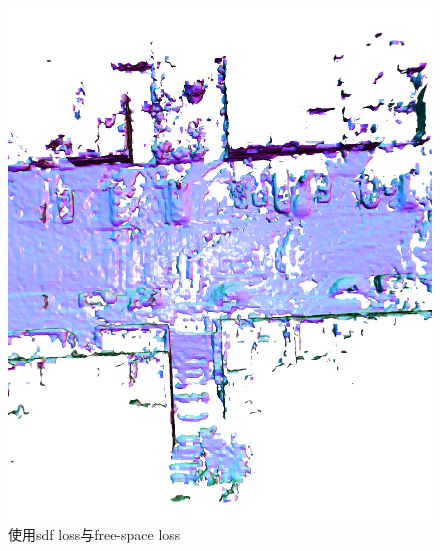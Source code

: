 \begin{figure}[htbp]
	\centering
	\begin{minipage}{0.45\linewidth}
		\centering
		\includegraphics[width=1\linewidth]{figures/kittiwbce.png}
        \caption*{使用sdf loss与free-space loss}
	\end{minipage}
	\begin{minipage}{0.45\linewidth}
		\centering

\end{minipage}
\end{figure}
